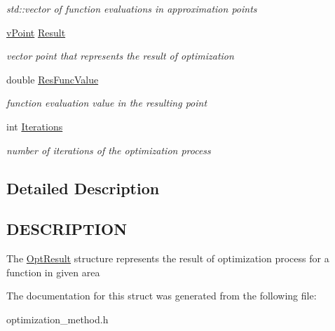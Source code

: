 \begin{DoxyCompactItemize}
\begin{DoxyCompactList}\small\item\em std\+::vector of function evaluations in approximation points \end{DoxyCompactList}\item 
\mbox{\label{struct_opt_result_ac4a11d14ca2867cff055e94ea49082cb}} 
\hyperlink{classv_point}{v\+Point} \hyperlink{struct_opt_result_ac4a11d14ca2867cff055e94ea49082cb}{Result}
\begin{DoxyCompactList}\small\item\em vector point that represents the result of optimization \end{DoxyCompactList}\item 
\mbox{\label{struct_opt_result_ac2f40006e97cd3b32b8d36cb61e8c9b5}} 
double \hyperlink{struct_opt_result_ac2f40006e97cd3b32b8d36cb61e8c9b5}{Res\+Func\+Value}
\begin{DoxyCompactList}\small\item\em function evaluation value in the resulting point \end{DoxyCompactList}\item 
\mbox{\label{struct_opt_result_a66494a483f7a183f8c382fa13e445b33}} 
int \hyperlink{struct_opt_result_a66494a483f7a183f8c382fa13e445b33}{Iterations}
\begin{DoxyCompactList}\small\item\em number of iterations of the optimization process \end{DoxyCompactList}\end{DoxyCompactItemize}


\subsection{Detailed Description}
\hypertarget{function_8h_DESCRIPTION}{}\subsection{D\+E\+S\+C\+R\+I\+P\+T\+I\+ON}\label{function_8h_DESCRIPTION}
The \hyperlink{struct_opt_result}{Opt\+Result} structure represents the result of optimization process for a function in given area 

The documentation for this struct was generated from the following file\+:\begin{DoxyCompactItemize}
\item 
optimization\+\_\+method.\+h\end{DoxyCompactItemize}
